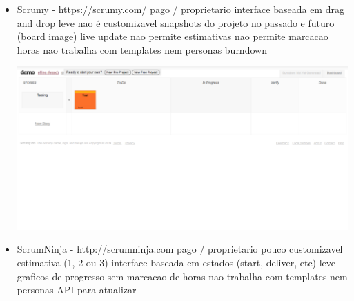 \begin{itemize}
\item Scrumy - https://scrumy.com/
pago / proprietario
interface baseada em drag and drop
leve
nao é customizavel
snapshots do projeto no passado e futuro (board image)
live update
nao permite estimativas
nao permite marcacao horas
nao trabalha com templates nem personas
burndown

\includegraphics[scale=0.2]{images/scrumy_1.png}

\item ScrumNinja - http://scrumninja.com
pago / proprietario
pouco customizavel
estimativa (1, 2 ou 3)
interface baseada em estados (start, deliver, etc)
leve
graficos de progresso
sem marcacao de horas
nao trabalha com templates nem personas
API para atualizar


\end{itemize}
